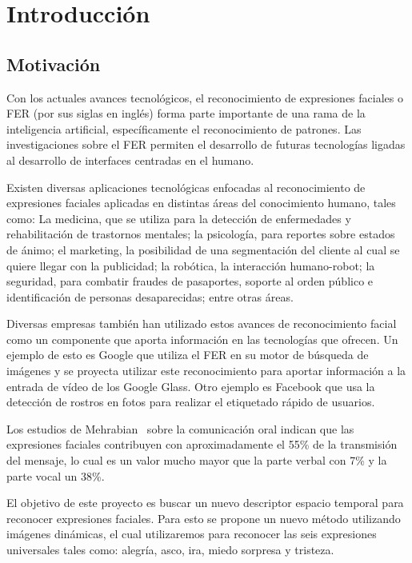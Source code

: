 \chapter[Introducción]{Introducción}
\label{ch:intro}

\section{Motivación}
\label{sec:motivacion}
Con los actuales avances tecnológicos, el reconocimiento de expresiones faciales o FER (por sus siglas en inglés) forma parte importante de una rama de la inteligencia artificial, específicamente el reconocimiento de patrones.  Las investigaciones sobre el FER permiten el desarrollo de futuras tecnologías ligadas al desarrollo de interfaces centradas en el humano. 

Existen diversas aplicaciones tecnológicas enfocadas al reconocimiento de expresiones faciales aplicadas en distintas áreas del conocimiento humano, tales como:  La medicina, que se utiliza para la detección de enfermedades y rehabilitación de trastornos mentales; la psicología, para reportes sobre estados de ánimo; el marketing, la posibilidad de una segmentación del cliente al cual se quiere llegar con la publicidad; la robótica, la interacción humano-robot; la seguridad, para combatir fraudes de pasaportes, soporte al orden público e identificación de personas desaparecidas; entre otras áreas.

Diversas empresas también han utilizado estos avances de reconocimiento facial como un componente que aporta información en las tecnologías que ofrecen. Un ejemplo de esto es  Google que utiliza el FER en su motor de búsqueda de imágenes y se proyecta utilizar este reconocimiento para aportar información a la entrada de vídeo de los Google Glass. Otro ejemplo es Facebook que usa la detección de rostros en  fotos para realizar el etiquetado rápido de usuarios.

Los estudios de Mehrabian~\cite{Mehrabian1968} sobre la comunicación oral indican que las expresiones faciales contribuyen con aproximadamente el 55\% de la transmisión del mensaje, lo cual es un valor mucho mayor que la parte verbal con 7\% y la parte vocal un 38\%.

El objetivo de este proyecto es buscar un nuevo descriptor espacio temporal para reconocer expresiones faciales. Para esto se propone un nuevo método utilizando imágenes dinámicas, el cual utilizaremos para reconocer las seis expresiones universales tales como: alegría, asco, ira, miedo sorpresa y tristeza.

